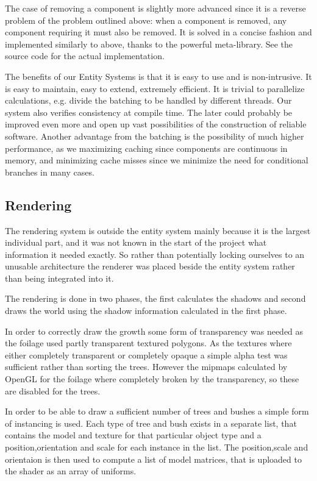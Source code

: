 The case of removing a component is slightly more advanced since it is a reverse problem of the problem outlined above: when a component is removed, any component requiring it must also be removed. It is solved in a concise fashion and implemented similarly to above, thanks to the powerful meta-library. See the source code for the actual implementation.

The benefits of our Entity Systems is that it is easy to use and is non-intrusive. It is easy to maintain, easy to extend, extremely efficient. It is trivial to parallelize calculations, e.g. divide the batching to be handled by different threads. Our system also verifies consistency at compile time. The later could probably be improved even more and open up vast possibilities of the construction of reliable software. Another advantage from the batching is the possibility of much higher performance, as we maximizing caching since components are continuous in memory, and minimizing cache misses since we minimize the need for conditional branches in many cases.

\newpage
\subsection{Rendering}
The rendering system is outside the entity system mainly because it is the largest individual part, and it was not known in the start of the project what information it needed exactly. So rather than potentially locking ourselves to an unusable architecture the renderer was placed beside the entity system rather than being integrated into it.

The rendering is done in two phases, the first calculates the shadows and second draws the world using the shadow information calculated in the first phase.

In order to correctly draw the growth some form of transparency was needed as the foilage used partly transparent textured polygons. As the textures where either completely transparent or completely opaque a simple alpha test was sufficient rather than sorting the trees. However the mipmaps calculated by OpenGL for the foilage where completely broken by the transparency, so these are disabled for the trees.

In order to be able to draw a sufficient number of trees and bushes a simple form of instancing is used. Each type of tree and bush exists in a separate list, that contains the model and texture for that particular object type and a position,orientation and scale for each instance in the list. The position,scale and orientaion is then used to compute a list of model matrices, that is uploaded to the shader as an array of uniforms.

